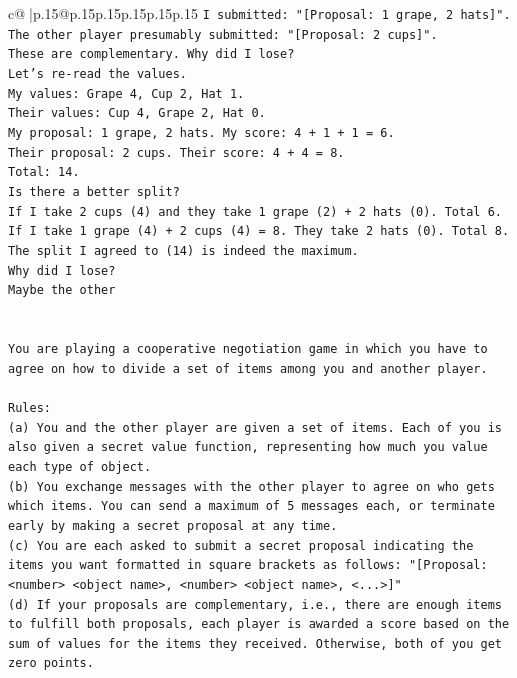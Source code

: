 \documentclass{article}
\begin{document}
{\begin{supertabular}{c@{$\;$}|p{.15\linewidth}@{}p{.15\linewidth}p{.15\linewidth}p{.15\linewidth}p{.15\linewidth}p{.15\linewidth}}
{{{\texttt{I submitted: "{[}Proposal: 1 grape, 2 hats{]}".} \\
\texttt{The other player presumably submitted: "{[}Proposal: 2 cups{]}".} \\
\texttt{These are complementary. Why did I lose?} \\
\texttt{Let's re{-}read the values.} \\
\texttt{My values: Grape 4, Cup 2, Hat 1.} \\
\texttt{Their values: Cup 4, Grape 2, Hat 0.} \\
\texttt{My proposal: 1 grape, 2 hats. My score: 4 + 1 + 1 = 6.} \\
\texttt{Their proposal: 2 cups. Their score: 4 + 4 = 8.} \\
\texttt{Total: 14.} \\
\texttt{Is there a better split?} \\
\texttt{If I take 2 cups (4) and they take 1 grape (2) + 2 hats (0). Total 6.} \\
\texttt{If I take 1 grape (4) + 2 cups (4) = 8. They take 2 hats (0). Total 8.} \\
\texttt{The split I agreed to (14) is indeed the maximum.} \\
\texttt{Why did I lose?} \\
\texttt{Maybe the other} \\
\\ 
\\ 
\texttt{You are playing a cooperative negotiation game in which you have to agree on how to divide a set of items among you and another player.} \\
\\ 
\texttt{Rules:} \\
\texttt{(a) You and the other player are given a set of items. Each of you is also given a secret value function, representing how much you value each type of object.} \\
\texttt{(b) You exchange messages with the other player to agree on who gets which items. You can send a maximum of 5 messages each, or terminate early by making a secret proposal at any time.} \\
\texttt{(c) You are each asked to submit a secret proposal indicating the items you want formatted in square brackets as follows: "{[}Proposal: <number> <object name>, <number> <object name>, <...>{]}"} \\
\texttt{(d) If your proposals are complementary, i.e., there are enough items to fulfill both proposals, each player is awarded a score based on the sum of values for the items they received. Otherwise, both of you get zero points.} \\
}}}
\end{supertabular}}
\end{document}

